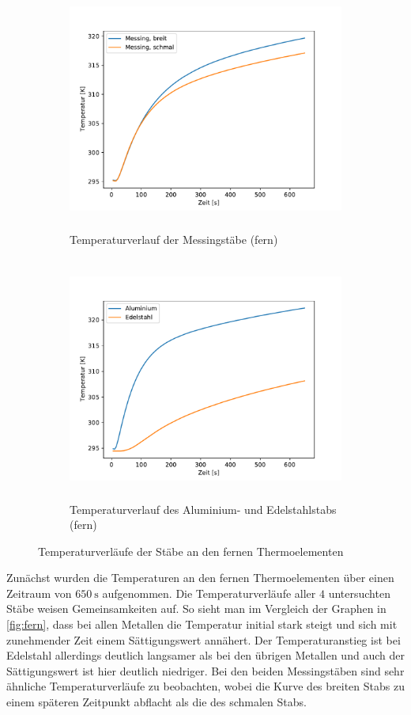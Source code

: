 \begin{figure}[H]
  \begin{subfigure}{\textwidth}
  \centering
  \includegraphics[height=8cm]{content/verlauf_mess.pdf}
  \caption{Temperaturverlauf der Messingstäbe (fern)}
  \label{fig:mess}
  \end{subfigure}
  \hfill
  \begin{subfigure}{\textwidth}
  \centering
  \includegraphics[height=8cm]{content/verlauf_alu_edel.pdf}
  \caption{Temperaturverlauf des Aluminium- und Edelstahlstabs (fern)}
  \label{fig:alu_edel}
  \end{subfigure}
  \caption{Temperaturverläufe der Stäbe an den fernen Thermoelementen}
  \label{fig:fern}
\end{figure}
Zunächst wurden die Temperaturen an den fernen Thermoelementen über einen Zeitraum von $\qty{650}{\second}$ aufgenommen.
Die Temperaturverläufe aller $4$ untersuchten Stäbe weisen Gemeinsamkeiten auf. So sieht man im Vergleich der Graphen in \autoref{fig:fern},
dass bei allen Metallen die Temperatur initial stark steigt und sich mit zunehmender Zeit einem Sättigungswert annähert.
Der Temperaturanstieg ist bei Edelstahl allerdings deutlich langsamer als bei den übrigen Metallen und auch der Sättigungswert ist hier deutlich niedriger.
Bei den beiden Messingstäben sind sehr ähnliche Temperaturverläufe zu beobachten, wobei die Kurve des breiten Stabs zu einem späteren Zeitpunkt abflacht als die des schmalen Stabs.


